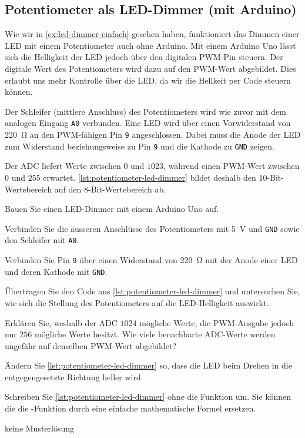 \subsection{Potentiometer als LED-Dimmer (mit Arduino)}

Wie wir in \cref{ex:led-dimmer-einfach} gesehen haben, funktioniert das Dimmen einer LED mit einem Potentiometer auch ohne Arduino. Mit einem Arduino Uno lässt sich die Helligkeit der LED jedoch über den digitalen PWM-Pin steuern. Der digitale Wert des Potentiometers wird dazu auf den PWM-Wert abgebildet. Dies erlaubt uns mehr Kontrolle über die LED, da wir die Hellkeit per Code steuern können.

\par
Der Schleifer (mittlere Anschluss) des Potentiometers wird wie zuvor mit dem analogen Eingang \texttt{A0} verbunden. Eine LED wird über einen Vorwiderstand von \qty{220}{\ohm} an den PWM-fähigen Pin \texttt{9} angeschlossen. Dabei muss die Anode der LED zum Widerstand beziehungsweise zu Pin \texttt{9} und die Kathode zu \texttt{GND} zeigen.

Der ADC liefert Werte zwischen $0$ und $1023$, während  einen PWM-Wert zwischen $0$ und $255$ erwartet. \cref{lst:potentiometer-led-dimmer} bildet deshalb den 10-Bit-Wertebereich auf den 8-Bit-Wertebereich ab.

\begin{myexercise}\label{ex:led-dimmer}
Bauen Sie einen LED-Dimmer mit einem Arduino Uno auf.
\begin{aenum}
	\item Verbinden Sie die äusseren Anschlüsse des Potentiometers mit \qty{5}{\volt} und \texttt{GND} sowie den Schleifer mit \texttt{A0}.
	\item Verbinden Sie Pin \texttt{9} über einen Widerstand von \qty{220}{\ohm} mit der Anode einer LED und deren Kathode mit \texttt{GND}.
	\item Übertragen Sie den Code aus \cref{lst:potentiometer-led-dimmer} und untersuchen Sie, wie sich die Stellung des Potentiometers auf die LED-Helligkeit auswirkt.
	\item Erklären Sie, weshalb der ADC $1024$ mögliche Werte, die PWM-Ausgabe jedoch nur $256$ mögliche Werte besitzt. Wie viele benachbarte ADC-Werte werden ungefähr auf denselben PWM-Wert abgebildet?
	\item Ändern Sie \cref{lst:potentiometer-led-dimmer} so, dass die LED beim Drehen in die entgegengesetzte Richtung heller wird.
    \item Schreiben Sie \cref{lst:potentiometer-led-dimmer} ohne die Funktion  um. Sie können die die -Funktion durch eine einfache mathematische Formel ersetzen.
\end{aenum}
\begin{myanswer}
    keine Musterlösung
\end{myanswer}
\end{myexercise}

